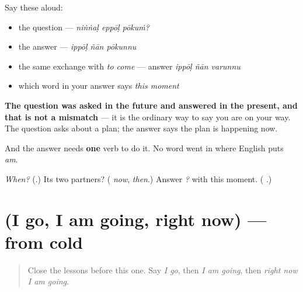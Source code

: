 Say these aloud:

\begin{itemize}
\raggedright
  \item the question — \emph{niṅṅaḷ eppōḷ pōkuṁ?}
  \item the answer — \emph{ippōḷ ñān pōkunnu}
  \item the same exchange with \emph{to come} — answer \emph{ippōḷ ñān varunnu}
  \item which word in your answer says \emph{this moment}
\end{itemize}

\begin{grammarlens}[title={What you've built}]
\textbf{The question was asked in the future and answered in the present, and that is not a mismatch} — it is the ordinary way to say you are on your way. The question asks about a plan; the answer says the plan is happening now.

And the answer needs \textbf{one} verb to do it. No word went in where English puts \emph{am}.
\end{grammarlens}

\begin{tcolorbox}[breakable,colback=teal!4,colframe=teal!35!black,title={Before you move on}]
\emph{When?} (\textbf{}.) Its two partners? (\textbf{} \emph{now}, \textbf{} \emph{then}.) Answer \emph{  ?} with this moment. (\textbf{  }.)
\end{tcolorbox}
\section[(I go, I am going, right now)]{(I go, I am going, right now) — from cold}

\label{lesson:ML-R104-present-recall}



\begin{quote}
Close the lessons before this one. Say \emph{I go}, then \emph{I am going}, then \emph{right now I am going}.
\end{quote}

